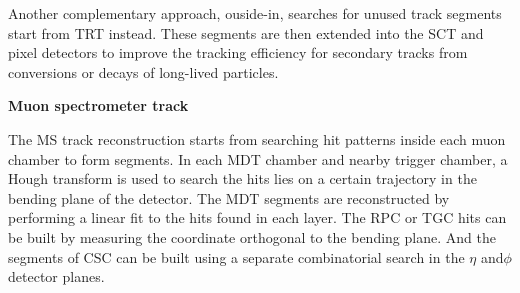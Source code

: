 Another complementary approach, ouside-in, searches for unused track segments start from TRT instead.
These segments are then extended into the SCT and pixel detectors to improve the tracking efficiency for secondary tracks from conversions or decays of long-lived particles.

\textbf{Muon spectrometer track}

The MS track reconstruction\cite{Aad:2016jkr} starts from searching hit patterns inside each muon chamber to form segments.
In each MDT chamber and nearby trigger chamber, a Hough transform\cite{ILLINGWORTH198887} is used to search the hits lies on a certain trajectory in the bending plane of the detector.
The MDT segments are reconstructed by performing a linear fit to the hits found in each layer.
The RPC or TGC hits can be built by measuring the coordinate orthogonal to the bending plane.
And the segments of CSC can be built using a separate combinatorial search in the $\eta$ and$\phi$ detector planes.
